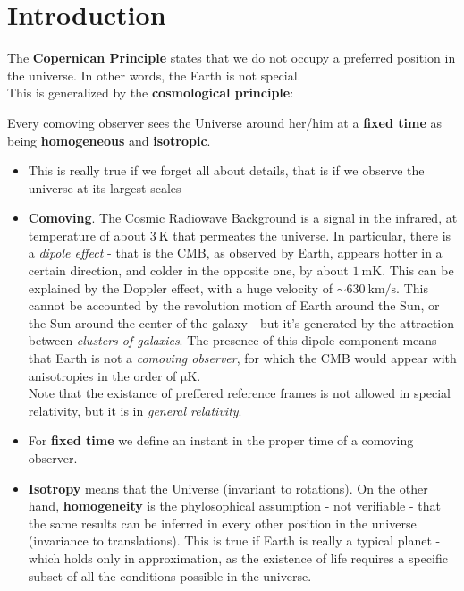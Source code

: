 \documentclass[../PhysUniverse.tex]{subfiles}
\begin{document}
\section{Introduction}
The \textbf{Copernican Principle} states that we do not occupy a preferred position in the universe. In other words, the Earth is not special.\\

This is generalized by the \textbf{cosmological principle}:
\begin{center}
Every comoving observer sees the Universe around her/him at a \textbf{fixed time} as being \textbf{homogeneous} and \textbf{isotropic}.
\end{center}
\begin{itemize}
\item This is really true if we forget all about details, that is if we observe the universe at its largest scales
\item \textbf{Comoving}. The Cosmic Radiowave Background is a signal in the infrared, at temperature of about $\SI{3}{\kelvin}$ that permeates the universe. In particular, there is a \textit{dipole effect} - that is the CMB, as observed by Earth, appears hotter in a certain direction, and colder in the opposite one, by about $\SI{1}{\milli\kelvin}$. This can be explained by the Doppler effect, with a huge velocity of $\sim \SI{630}{\kilo\m\per\s}$. This cannot be accounted by the revolution motion of Earth around the Sun, or the Sun around the center of the galaxy - but it's generated by the attraction between \textit{clusters of galaxies}. The presence of this dipole component means that Earth is not a \textit{comoving observer}, for which the CMB would appear with anisotropies in the order of $\si{\micro\kelvin}$.\\
Note that the existance of preffered reference frames is not allowed in special relativity, but it is in \textit{general relativity}.
\item For \textbf{fixed time} we define an instant in the proper time of a comoving observer.
\item \textbf{Isotropy} means that the Universe  (invariant to rotations). On the other hand, \textbf{homogeneity} is the phylosophical assumption - not verifiable - that the same results can be inferred in every other position in the universe (invariance to translations). This is true if Earth is really a typical planet - which holds only in approximation, as the existence of life requires a specific subset of all the conditions possible in the universe.
\end{itemize}
\end{document}
